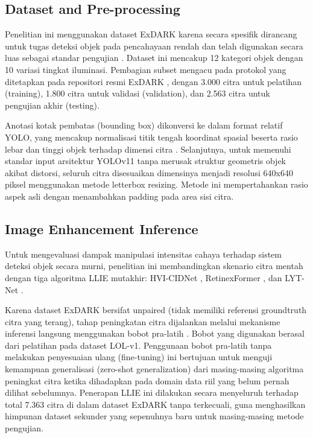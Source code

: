 \documentclass[conference]{IEEEtran}
\begin{document}
\subsection{Dataset and Pre-processing}
Penelitian ini menggunakan dataset ExDARK karena secara spesifik dirancang untuk tugas deteksi objek pada pencahayaan rendah dan telah digunakan secara luas sebagai standar pengujian \cite{loh2019exdark}. Dataset ini mencakup 12 kategori objek dengan 10 variasi tingkat iluminasi. Pembagian subset mengacu pada protokol yang ditetapkan pada repositori resmi ExDARK \cite{loh2019exdark}, dengan 3.000 citra untuk pelatihan (training), 1.800 citra untuk validasi (validation), dan 2.563 citra untuk pengujian akhir (testing).

Anotasi kotak pembatas (bounding box) dikonversi ke dalam format relatif YOLO, yang mencakup normalisasi titik tengah koordinat spasial beserta rasio lebar dan tinggi objek terhadap dimensi citra \cite{padilla2021metrics,lin2014coco}. Selanjutnya, untuk memenuhi standar input arsitektur YOLOv11 tanpa merusak struktur geometris objek akibat distorsi, seluruh citra disesuaikan dimensinya menjadi resolusi 640x640 piksel menggunakan metode letterbox resizing. Metode ini mempertahankan rasio aspek asli dengan menambahkan padding pada area sisi citra.

\subsection{Image Enhancement Inference}
Untuk mengevaluasi dampak manipulasi intensitas cahaya terhadap sistem deteksi objek secara murni, penelitian ini membandingkan skenario citra mentah dengan tiga algoritma LLIE mutakhir: HVI-CIDNet \cite{yan2025hvi}, RetinexFormer \cite{cai2023retinexformer}, dan LYT-Net \cite{brateanu2025lytnet}. 

Karena dataset ExDARK bersifat unpaired (tidak memiliki referensi groundtruth citra yang terang), tahap peningkatan citra dijalankan melalui mekanisme inferensi langsung menggunakan bobot pra-latih \cite{hvicidnet2025,retinexformer2023,lytnets2024}. Bobot yang digunakan berasal dari pelatihan pada dataset LOL-v1. Penggunaan bobot pra-latih tanpa melakukan penyesuaian ulang (fine-tuning) ini bertujuan untuk menguji kemampuan generalisasi (zero-shot generalization) dari masing-masing algoritma peningkat citra ketika dihadapkan pada domain data riil yang belum pernah dilihat sebelumnya. Penerapan LLIE ini dilakukan secara menyeluruh terhadap total 7.363 citra di dalam dataset ExDARK tanpa terkecuali, guna menghasilkan himpunan dataset sekunder yang sepenuhnya baru untuk masing-masing metode pengujian.
\end{document}
